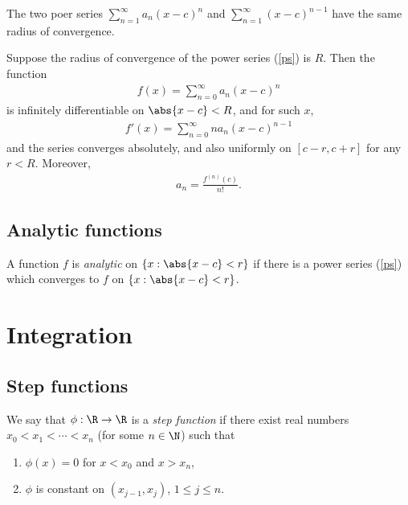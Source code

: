\documentclass{article}
\begin{document}
\begin{lemma}[Notes 3.1]
	The two poer series $\sum_{n=1}^\infty a_n(x-c)^n$ and $\sum_{n=1}^\infty (x-c)^{n-1}$
	have the same radius of convergence.
\end{lemma}

\begin{theorem}[Notes 3.3]
	Suppose the radius of convergence of the power series (\ref{ps}) is $R$. Then
	the function
	\begin{align*}
		f(x) = \sum_{n=0}^\infty a_n(x-c)^n
	\end{align*}
	is infinitely differentiable on $\abs{x-c} < R$, and for such $x$,
	\begin{align*}
		f'(x) = \sum_{n=0}^\infty na_n(x-c)^{n-1}
	\end{align*}
	and the series converges absolutely, and also uniformly on $[c-r, c+r]$ for any
	$r<R$. Moreover,
	\begin{align*}
		a_n = \frac{f^{(n)}(c)}{n!}.
	\end{align*}
\end{theorem}

\subsection{Analytic functions}

\begin{definition}
	A function $f$ is \emph{analytic} on $\{x: \abs{x-c}<r\}$ if there is a power
	series (\ref{ps}) which converges to $f$ on $\{x: \abs{x-c}<r\}$.
\end{definition}

\section{Integration}

\subsection{Step functions}

\begin{definition}[Notes 4.1]
	We say that $\phi:\R\to\R$ is a \emph{step function} if there exist real numbers
	$x_0<x_1<\cdots < x_n$ (for some $n\in\N$) such that
	\begin{enumerate}
		\item $\phi(x)=0$ for $x<x_0$ and $x>x_n$,
		\item $\phi$ is constant on $(x_{j-1}, x_j)$, $1\leq j\leq n$.
	\end{enumerate}
\end{definition}
\end{document}
